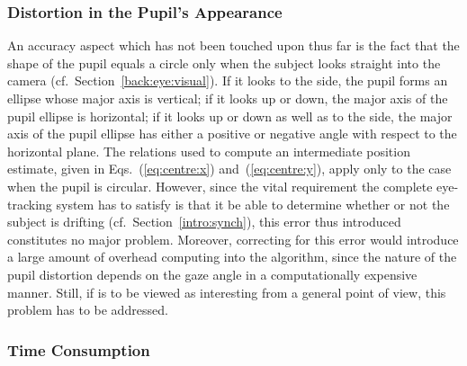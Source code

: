 
\subsubsection{Distortion in the Pupil's Appearance}

An accuracy aspect which has not been touched upon thus far is the
fact that the shape of the pupil equals a circle only when the subject
looks straight into the camera (cf.\ Section~\ref{back:eye:visual}).
If it looks to the side, the pupil forms an ellipse whose major axis
is vertical; if it looks up or down, the major axis of the pupil
ellipse is horizontal; if it looks up or down as well as to the side,
the major axis of the pupil ellipse has either a positive or negative
angle with respect to the horizontal plane.  The relations used to
compute an intermediate position estimate, given in
Eqs.~(\ref{eq:centre:x}) and~(\ref{eq:centre:y}), apply only to the
case when the pupil is circular.  However, since the vital requirement
the complete eye-tracking system has to satisfy is that it be able to
determine whether or not the subject is drifting (cf.\ 
Section~\ref{intro:synch}), this error thus introduced constitutes no
major problem.  Moreover, correcting for this error would introduce a
large amount of overhead computing into the algorithm, since the
nature of the pupil distortion depends on the gaze angle in a
computationally expensive manner.  Still, if {\octopus} is to be
viewed as interesting from a general point of view, this problem has
to be addressed.

\subsubsection{Time Consumption}


